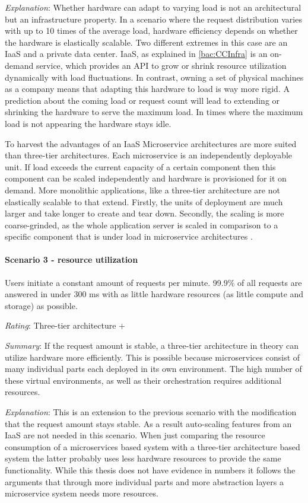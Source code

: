 \textit{Explanation}:
Whether hardware can adapt to varying load is not an architectural but an infrastructure property.
In a scenario where the request distribution varies with up to 10 times of the average load, hardware efficiency depends on whether the hardware is elastically scalable.
Two different extremes in this case are an \ac{IaaS} and a private data center.
\ac{IaaS}, as explained in \ref{bac:CCInfra} is an on-demand service, which provides an API to grow or shrink resource utilization dynamically with load fluctuations.
In contrast, owning a set of physical machines as a company means that adapting this hardware to load is way more rigid.
A prediction about the coming load or request count will lead to extending or shrinking the hardware to serve the maximum load.
In times where the maximum load is not appearing the hardware stays idle.

To harvest the advantages of an \ac{IaaS} Microservice architectures are more suited than three-tier architectures.
Each microservice is an independently deployable unit.
If load exceeds the current capacity of a certain component then this component can be scaled independently and hardware is provisioned for it on demand.
More monolithic applications, like a three-tier architecture are not elastically scalable to that extend.
Firstly, the units of deployment are much larger and take longer to create and tear down.
Secondly, the scaling is more coarse-grinded, as the whole application server is scaled in comparison to a specific component that is under load in microservice architectures \citep[p. 11]{Stine2015}.


\paragraph{Scenario 3 - resource utilization} Users initiate a constant amount of requests per minute. 99.9\% of all requests are answered in under 300 ms with as little hardware resources (as little compute and storage) as possible.
\label{quaMicro:s3}

\textit{Rating}: Three-tier architecture +

\textit{Summary}: If the request amount is stable, a three-tier architecture in theory can utilize hardware more efficiently. 
This is possible because microservices consist of many individual parts each deployed in its own environment. 
The high number of these virtual environments, as well as their orchestration requires additional resources.

\textit{Explanation}:
This is an extension to the previous scenario with the modification that the request amount stays stable.
As a result auto-scaling features from an \ac{IaaS} are not needed in this scenario.
When just comparing the resource consumption of a microservices based system with a three-tier architecture based system the latter probably uses less hardware resources to provide the same functionality.
While this thesis does not have evidence in numbers it follows the arguments that through more individual parts and more abstraction layers a microservice system needs more resources.

